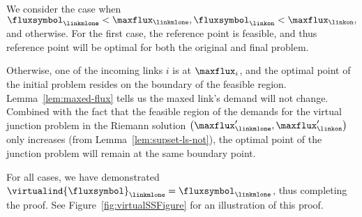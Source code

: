 We consider the case when $\fluxsymbol_{\linkmlone}<\maxflux_{\linkmlone},\fluxsymbol_{\linkon}<\maxflux_{\linkon},$
and otherwise. For the first case, the reference point is feasible,
and thus reference point will be optimal for both the original and
final problem.

Otherwise, one of the incoming links $i$ is at $\maxflux_{i}$, and
the optimal point of the initial problem resides on the boundary of
the feasible region. Lemma~\ref{lem:maxed-flux} tells us the maxed
link's demand will not change. Combined with the fact that the feasible
region of the demands for the virtual junction problem in the Riemann
solution $\left(\maxflux'_{\linkmlone},\maxflux'_{\linkon}\right)$
only increases (from Lemma~\ref{lem:supset-ls-not}), the optimal
point of the junction problem will remain at the same boundary point.

For all cases, we have demonstrated $\virtualind{\fluxsymbol}_{\linkmlone}=\fluxsymbol_{\linkmlone}$,
thus completing the proof. See Figure~\ref{fig:virtualSSFigure} for an illustration of this proof.



